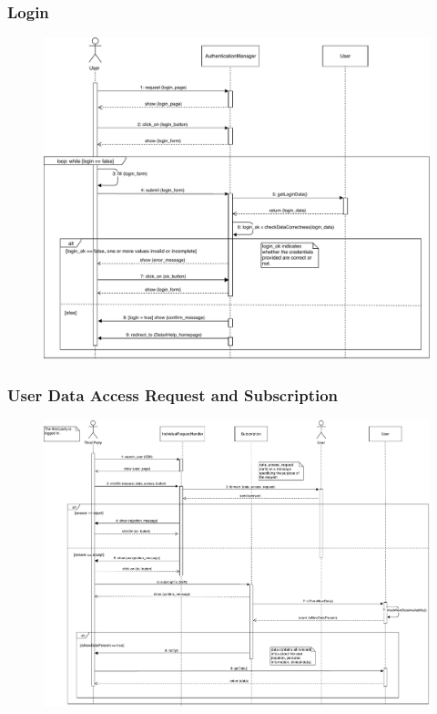 \documentclass[12pt,a4paper]{article}
\begin{document}
		\subsubsection{Login}
		\begin{figure}[H]
			\centering
			\includegraphics[width=1.2\linewidth]{Images/login_sequence}
			\label{fig:login_sequence}
		\end{figure}
		\subsubsection{User Data Access Request and Subscription}
		\begin{figure}[H]
			\centering
			\includegraphics[width=1.2\linewidth]{Images/request_subscription_sequence}
			\label{fig:request_subscription_sequence}
		\end{figure}
\end{document}
